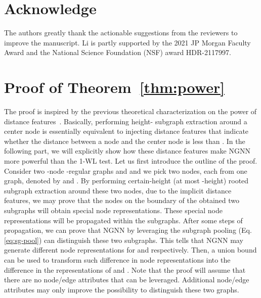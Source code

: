 \documentclass{article}
\begin{document}
\section*{Acknowledge}
The authors greatly thank the actionable suggestions from the reviewers to improve the manuscript. Li is partly supported by the 2021 JP Morgan Faculty Award and the National Science Foundation (NSF) award HDR-2117997.












\appendix

\section{Proof of Theorem~\ref{thm:power}}\label{proof:power}
The proof is inspired by the previous theoretical characterization on the power of distance features~\cite{li2020distance}. Basically, performing height- subgraph extraction around a center node is essentially equivalent to injecting distance features that indicate whether the distance between a node and the center node is less than . In the following part, we will explicitly show how these distance features make NGNN more powerful than the 1-WL test. Let us first introduce the outline of the proof. Consider two -node -regular graphs  and  and we pick two nodes, each from one graph, denoted by  and . By performing certain-height (at most -height) rooted subgraph extraction around these two nodes, due to the implicit distance features, we may prove that the nodes on the boundary of the obtained two subgraphs will obtain special node representations. These special node representations will be propagated within the subgraphs. After some steps of propagation, we can prove that NGNN by leveraging the subgraph pooling (Eq. \ref{eq:sg-pool}) can distinguish these two subgraphs. This tells that NGNN may generate different node representations for  and  respectively. Then, a union bound can be used to transform such difference in node representations into the difference in the representations of  and . Note that the proof will assume that there are no node/edge attributes that can be leveraged. Additional node/edge attributes may only improve the possibility to distinguish these two graphs.
\end{document}
